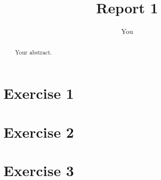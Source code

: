 \documentclass{article}
\title{Report 1}
\author{You}
\begin{document}
\maketitle

\begin{abstract}
Your abstract.
\end{abstract}

\section{Exercise 1}



\section{Exercise 2}

\section{Exercise 3}




\end{document}

